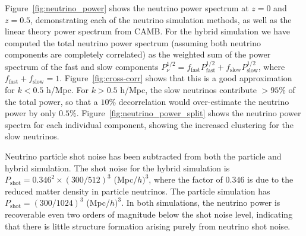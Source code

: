 \documentclass[useAMS, usenatbib]{mnras}
\begin{document}
Figure~\ref{fig:neutrino_power} shows the neutrino power spectrum at $z=0$ and $z=0.5$, demonstrating each of the neutrino simulation methods, as well as the linear theory power spectrum from CAMB. For the hybrid simulation we have computed the total neutrino power spectrum (assuming both neutrino components are completely correlated) as the weighted sum of the power spectrum of the fast and slow components $P^{1/2}_\nu = f_\mathrm{fast} P^{1/2}_\mathrm{fast} + f_\mathrm{slow} P^{1/2}_\mathrm{slow}$, where $f_\mathrm{fast} + f_\mathrm{slow} = 1$. Figure~\ref{fig:cross-corr} shows that this is a good approximation for $k < 0.5$ h/Mpc. For $k > 0.5$ h/Mpc, the slow neutrinos contribute $> 95\%$ of the total power, so that a $10\%$ decorrelation would over-estimate the neutrino power by only $0.5\%$. Figure~\ref{fig:neutrino_power_split} shows the neutrino power spectra for each individual component, showing the increased clustering for the slow neutrinos.

Neutrino particle shot noise has been subtracted from both the particle and hybrid simulation. The shot noise for the hybrid simulation is $P_\mathrm{shot} = 0.346^2\times (300 /512)^3 $ (Mpc/$h)^3$, where the factor of $0.346$ is due to the reduced matter density in particle neutrinos. The particle simulation has $P_\mathrm{shot} = (300 /1024)^3$ (Mpc/$h)^3$. In both simulations, the neutrino power is recoverable even two orders of magnitude below the shot noise level, indicating that there is little structure formation arising purely from neutrino shot noise.

\end{document}
